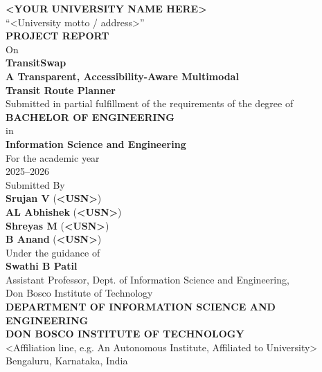 \documentclass[12pt,a4paper]{report}
\begin{document}
\begin{titlepage}
\begin{center}

{\Large \textbf{<YOUR UNIVERSITY NAME HERE>}}\\[2pt]
{\small ``<University motto / address>''}\\[30pt]

{\large \textbf{PROJECT REPORT}}\\[4pt]
On\\[10pt]

{\Huge \textbf{TransitSwap}}\\[6pt]
{\Large \textbf{A Transparent, Accessibility-Aware Multimodal}}\\
{\Large \textbf{Transit Route Planner}}\\[20pt]

{\normalsize Submitted in partial fulfillment of the requirements of the degree of}\\[6pt]
{\large \textbf{BACHELOR OF ENGINEERING}}\\[4pt]
in\\[4pt]
{\large \textbf{Information Science and Engineering}}\\[6pt]
{\normalsize For the academic year}\\
{\normalsize 2025--2026}\\[24pt]

{\normalsize Submitted By}\\[6pt]
{\large \textbf{Srujan V}} \quad (\textbf{<USN>})\\
{\large \textbf{AL Abhishek}} \quad (\textbf{<USN>})\\
{\large \textbf{Shreyas M}} \quad (\textbf{<USN>})\\
{\large \textbf{B Anand}} \quad (\textbf{<USN>})\\[20pt]

{\normalsize Under the guidance of}\\[6pt]
{\large \textbf{Swathi B Patil}}\\
{\normalsize Assistant Professor, Dept. of Information Science and Engineering,}\\
{\normalsize Don Bosco Institute of Technology}\\[30pt]

{\large \textbf{DEPARTMENT OF INFORMATION SCIENCE AND ENGINEERING}}\\[4pt]
{\large \textbf{DON BOSCO INSTITUTE OF TECHNOLOGY}}\\[2pt]
{\normalsize <Affiliation line, e.g. An Autonomous Institute, Affiliated to University>}\\
{\normalsize Bengaluru, Karnataka, India}\\

\end{center}
\end{titlepage}
\end{document}
